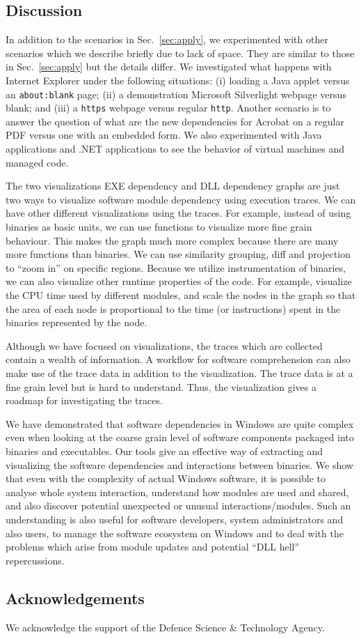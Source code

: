 \subsection{Discussion}

In addition to the scenarios in Sec.~\ref{sec:apply},
we experimented with other scenarios which we describe briefly due to lack
of space. They are similar to those in Sec.~\ref{sec:apply} but the details differ.
We investigated what happens with Internet Explorer under
the following situations:
(i) loading a Java applet versus an {\tt about:blank} page;
(ii) a demonstration Microsoft Silverlight webpage versus blank; and
(iii) a {\tt https} webpage versus regular {\tt http}.
Another scenario is to answer the question of
what are the new dependencies for Acrobat on a regular PDF versus
one with an embedded form.
We also experimented with Java applications and .NET applications
to see the behavior of virtual machines and managed code.

The two visualizations EXE dependency and DLL dependency graphs are just two
ways to visualize software module dependency using execution traces.
We can have other different visualizations using the traces.
For example, instead of using binaries as basic units, we can use functions
to visualize more fine grain behaviour.
This makes the graph much more complex because there are many more functions
than binaries.
We can use similarity grouping, diff and projection to ``zoom in''
on specific regions.
Because we utilize instrumentation of binaries, we can also visualize other runtime
properties of the code.
For example, visualize the CPU time used by different modules,
and scale the nodes in the graph so that the area of each node is proportional to the time
(or instructions) spent in the binaries represented by the node.

Although we have focused on visualizations, the traces which are collected
contain a wealth of information. A workflow for software comprehension can also make use
of the trace data in addition to the visualization.
The trace data is at a fine grain level but is hard to understand.
Thus, the visualization gives a roadmap for investigating the traces.

We have demonstrated that software dependencies in Windows are quite
complex even when looking at the coarse grain level of software components
packaged into binaries and executables.
Our tools give an effective way of extracting and
visualizing the software dependencies and interactions between binaries.
We show that even with the complexity of actual Windows software,
it is possible to analyse whole system interaction,
understand how modules are used and shared,
and also discover potential unexpected or unusual interactions/modules.
Such an understanding is also useful for software developers,
system administrators and also users, to manage the
software ecosystem on Windows and to deal with the problems which arise
from module updates and potential ``DLL hell'' repercussions.

\subsection{Acknowledgements}

We acknowledge the support of the Defence Science \& Technology Agency.


